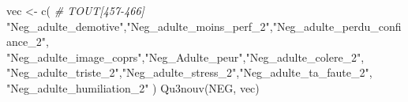 \documentclass[
]{article}
\newenvironment{Shaded}{\begin{snugshade}}{\end{snugshade}}
\newcommand{\CommentTok}[1]{\textcolor[rgb]{0.56,0.35,0.01}{\textit{#1}}}
\newcommand{\FunctionTok}[1]{\textcolor[rgb]{0.00,0.00,0.00}{#1}}
\newcommand{\NormalTok}[1]{#1}
\newcommand{\OtherTok}[1]{\textcolor[rgb]{0.56,0.35,0.01}{#1}}
\newcommand{\StringTok}[1]{\textcolor[rgb]{0.31,0.60,0.02}{#1}}
\begin{document}
\begin{Shaded}
\begin{Highlighting}[]
\NormalTok{vec }\OtherTok{\textless{}{-}} \FunctionTok{c}\NormalTok{(   }\CommentTok{\# TOUT[457{-}466]}
  \StringTok{"Neg\_adulte\_demotive"}\NormalTok{,}\StringTok{"Neg\_adulte\_moins\_perf\_2"}\NormalTok{,}\StringTok{"Neg\_adulte\_perdu\_confiance\_2"}\NormalTok{,}
  \StringTok{"Neg\_adulte\_image\_coprs"}\NormalTok{,}\StringTok{"Neg\_Adulte\_peur"}\NormalTok{,}\StringTok{"Neg\_adulte\_colere\_2"}\NormalTok{,}
  \StringTok{"Neg\_adulte\_triste\_2"}\NormalTok{,}\StringTok{"Neg\_adulte\_stress\_2"}\NormalTok{,}\StringTok{"Neg\_adulte\_ta\_faute\_2"}\NormalTok{,}
  \StringTok{"Neg\_adulte\_humiliation\_2"}
\NormalTok{  )}
\FunctionTok{Qu3nouv}\NormalTok{(NEG, vec)}
\end{Highlighting}
\end{Shaded}
\end{document}
